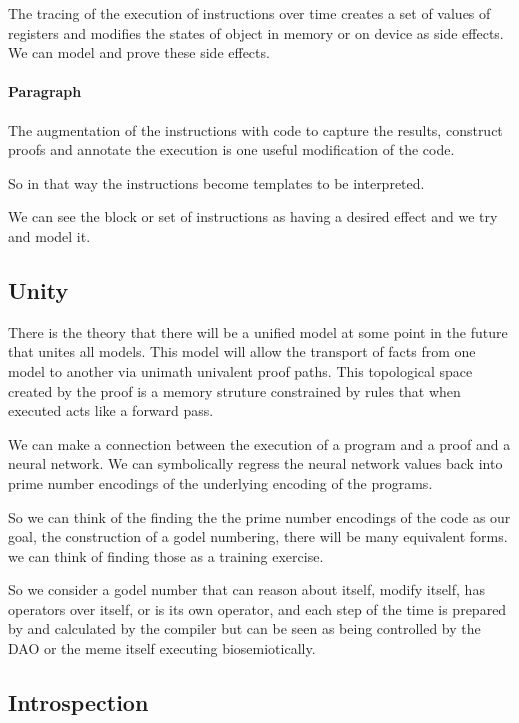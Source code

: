 \documentclass{article}
\begin{document}
The tracing of the execution of instructions over time
creates a set of values of registers and modifies the states
of object in memory or on device as side effects.
We can model and prove these side effects.

\paragraph{Paragraph}

The augmentation of the instructions with code
to capture the results, construct proofs and annotate the execution
is one useful modification of the code. 

So in that way the instructions become templates to be interpreted.

We can see the block or set of instructions as having a desired effect
and we try and model it. 

\subsection{Unity}

There is the theory
that there will be a unified model at some point in the future that unites all models. This model will allow the transport of facts from one model to another via unimath univalent proof paths. This topological space created by the proof is a memory struture constrained by rules that when executed acts like a forward pass.

We can make a connection between the execution of a program and a proof and a neural network. We can symbolically regress the neural network values back into prime number encodings of the underlying encoding of the programs.

So we can think of the finding the the prime number encodings of the code as our goal, the construction of a godel numbering, there will be many equivalent forms. we can think of finding those as a training exercise.

So we consider a godel number that can reason about itself, modify itself, has operators over itself, or is its own operator, and each step of the time is prepared by and calculated by the compiler but can be seen as being controlled by the DAO or the meme itself executing biosemiotically.

\subsection{Introspection}
\end{document}
